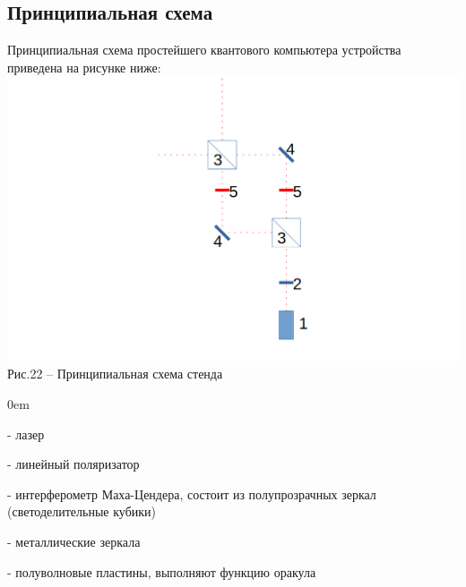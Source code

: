 \documentclass[11pt]{report}
\begin{document}
\subsection{Принципиальная схема}
Принципиальная схема простейшего квантового компьютера  устройства приведена на рисунке ниже:\\
\includegraphics[scale=0.3]{ust_f} \\
Рис.22 -- Принципиальная схема стенда \\

\begin{description}
\addtolength{\itemindent}{0.80cm}
\itemsep0em 
\item[1] - лазер
\item[2] - линейный поляризатор
\item[3] - интерферометр Маха-Цендера, состоит из полупрозрачных зеркал (светоделительные кубики)
\item[4] - металлические зеркала
\item[5] - полуволновые пластины, выполняют функцию оракула 
\end{description}


\begin{figure}[h]
\end{figure} 
\end{document}
